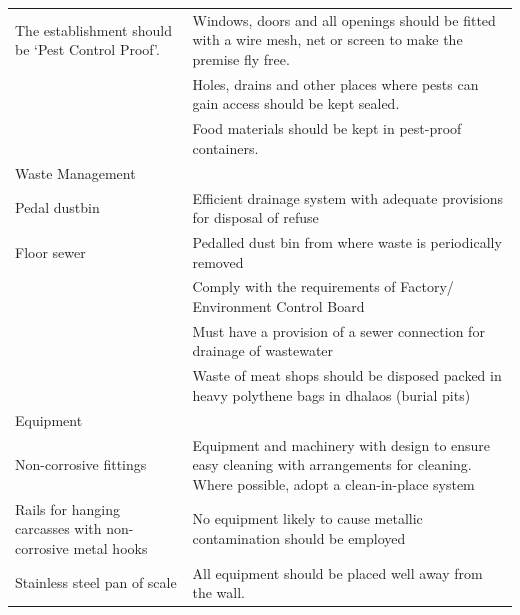\documentclass[a4paper, 12pt]{article}
\newcommand\tabitem{\makebox[1em][r]{\textbullet~}}
\begin{document}
\begin{longtable}{>{\raggedright}p{6.5cm}>{\raggedright\arraybackslash}p{8.5cm}}
	\newline{}\tabitem The establishment should be ‘Pest Control Proof’. 	&	\newline{} \tabitem Windows, doors and all openings should be fitted with a wire mesh, net or screen to make the premise fly free.\\
	&	\newline{}\tabitem Holes, drains and other places where pests can gain access should be kept sealed.\\
	&	\newline{}\tabitem Food materials should be kept in pest-proof containers. \\
    \midrule
   Waste Management 	&	\\
    \midrule
    \tabitem Pedal dustbin	& 	\tabitem Efficient drainage system with adequate provisions for disposal of refuse\\
	\newline{} \tabitem Floor sewer & \newline{} \tabitem Pedalled dust bin from where waste is periodically removed\\\newline{}
	&	\newline{} \tabitem Comply with the requirements of Factory/ Environment Control Board \\
	&	\newline{} \tabitem Must have a provision of a sewer connection for drainage of wastewater\\
	&	\newline{} \tabitem Waste of meat shops should be disposed packed in heavy polythene bags in dhalaos (burial pits) \\
\midrule
    Equipment	&  \\
    \midrule
    \tabitem Non-corrosive fittings & \tabitem Equipment and machinery with design to ensure easy cleaning with arrangements for cleaning. Where possible, adopt a clean-in-place system\\
	\newline{} \tabitem Rails for hanging carcasses with non-corrosive metal hooks 	&	\newline{} \tabitem No equipment likely to cause metallic contamination should be employed\\
	\newline{} \tabitem Stainless steel pan of scale	&	\newline{} \tabitem All equipment should be placed well away from the wall.\\

\end{longtable}
\end{document}
